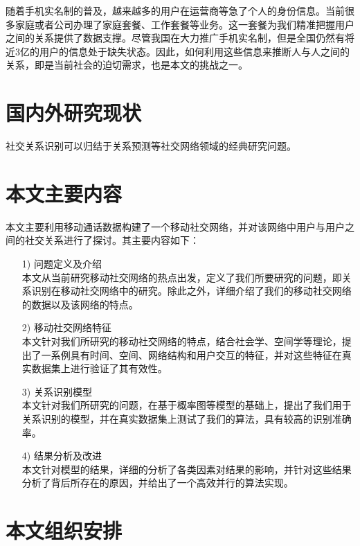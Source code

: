 随着手机实名制的普及，越来越多的用户在运营商等急了个人的身份信息。当前很多家庭或者公司办理了家庭套餐、工作套餐等业务。这一套餐为我们精准把握用户之间的关系提供了数据支撑。尽管我国在大力推广手机实名制，但是全国仍然有将近3亿的用户的信息处于缺失状态。因此，如何利用这些信息来推断人与人之间的关系，即是当前社会的迫切需求，也是本文的挑战之一。


\section{国内外研究现状}

社交关系识别可以归结于关系预测等社交网络领域的经典研究问题。




\section{本文主要内容}

本文主要利用移动通话数据构建了一个移动社交网络，并对该网络中用户与用户之间的社交关系进行了探讨。其主要内容如下：

\begin{enumerate}
\item[1)]问题定义及介绍 \\
本文从当前研究移动社交网络的热点出发，定义了我们所要研究的问题，即关系识别在移动社交网络中的研究。除此之外，详细介绍了我们的移动社交网络的数据以及该网络的特点。

\item[2)] 移动社交网络特征 \\
本文针对我们所研究的移动社交网络的特点，结合社会学、空间学等理论，提出了一系例具有时间、空间、网络结构和用户交互的特征，并对这些特征在真实数据集上进行验证了其有效性。

\item[3)] 关系识别模型 \\
本文针对我们所研究的问题，在基于概率图等模型的基础上，提出了我们用于关系识别的模型，并在真实数据集上测试了我们的算法，具有较高的识别准确率。

\item[4)] 结果分析及改进 \\
本文针对模型的结果，详细的分析了各类因素对结果的影响，并针对这些结果分析了背后所存在的原因，并给出了一个高效并行的算法实现。
\end{enumerate}



\section{本文组织安排}

